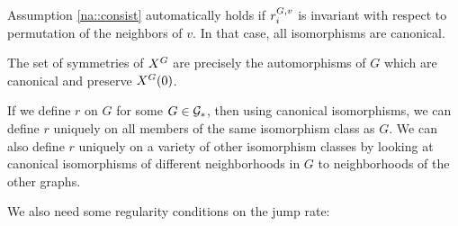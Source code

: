 \remark Assumption \ref{na::consist} automatically holds if \(r^{G,v}_{i}\) is invariant with respect to permutation of the neighbors of \(v\). In that case, all isomorphisms are canonical.

\remark The set of symmetries of \(X^{G}\) are precisely the automorphisms of \(G\) which are canonical and preserve \(X^{G}(0)\).

\remark If we define \(r\) on \(G\) for some \(G \in \mathcal{G}_\ast\), then using canonical isomorphisms, we can define \(r\) uniquely on all members of the same isomorphism class as \(G\). We can also define \(r\) uniquely on a variety of other isomorphism classes by looking at canonical isomorphisms of different neighborhoods in \(G\) to neighborhoods of the other graphs. 

\skipLine

We also need some regularity conditions on the jump rate:

\lin

